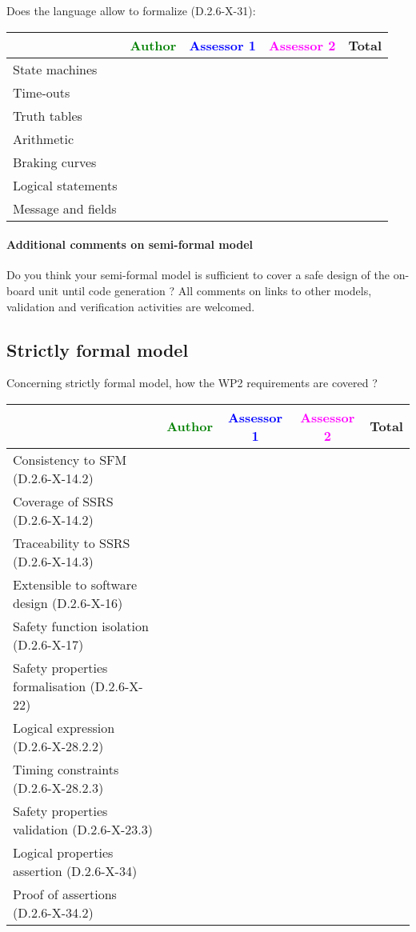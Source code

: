 Does the language allow to  formalize (D.2.6-X-31):

\begin{tabular}{|l | c | c | c | c|}
\hline
& \textcolor{green}{Author} & \textcolor{blue}{Assessor 1} & \textcolor{magenta}{Assessor 2} & Total \\
\hline 
State machines  & & & &  \\
\hline
Time-outs  & & & &  \\
\hline
Truth tables  & & & &  \\
\hline
Arithmetic  & & & &  \\
\hline
Braking curves  & & & &  \\
\hline
Logical statements & & & &  \\
\hline
Message and fields & & & &  \\
\hline
\end{tabular}

\paragraph{Additional comments on semi-formal  model} Do you think your semi-formal  model is sufficient to cover a safe design of the on-board unit until code generation ?
All comments on links to  other models, validation and verification activities are welcomed.

\subsection{Strictly formal model}

Concerning strictly formal model, how the WP2 requirements are covered ?

\begin{tabular}{|l | c | c | c | c|}
\hline
& \textcolor{green}{Author} & \textcolor{blue}{Assessor 1} & \textcolor{magenta}{Assessor 2} & Total \\
\hline 
Consistency to SFM (D.2.6-X-14.2) & & & &  \\
\hline
Coverage of SSRS (D.2.6-X-14.2)  & & & &  \\
\hline
Traceability to  SSRS (D.2.6-X-14.3)  & & & &  \\
\hline
Extensible to software design (D.2.6-X-16)  & & & &  \\
\hline
Safety function isolation (D.2.6-X-17)  & & & &  \\
\hline 
Safety properties formalisation (D.2.6-X-22)  & & & &  \\
\hline
Logical expression (D.2.6-X-28.2.2)  & & & &  \\
\hline
Timing constraints (D.2.6-X-28.2.3)  & & & &  \\
\hline
Safety properties validation (D.2.6-X-23.3)  & & & &  \\
\hline
Logical properties assertion (D.2.6-X-34)  & & & &  \\
\hline
Proof of assertions (D.2.6-X-34.2)  & & & &  \\
\hline
\end{tabular}

